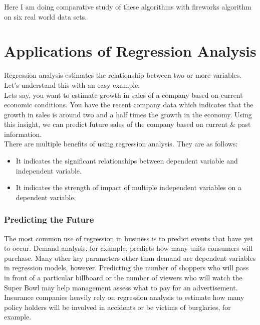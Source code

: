 \documentclass[11pt, a4paper]{report}
\begin{document}
Here I am doing comparative study of these algorithms with fireworks algorithm on six real world data sets.
\section{Applications of Regression Analysis}

Regression analysis estimates the relationship between two or more variables. Let’s understand this with an easy example: \\

Let\textquotesingle s say, you want to estimate growth in sales of a company based on current economic conditions. You have the recent company data which indicates that the growth in sales is around two and a half times the growth in the economy. Using this insight, we can predict future sales of the company based on current \& past information. \\

There are multiple benefits of using regression analysis. They are as follows:

\begin{itemize}
	\item It indicates the significant relationships between dependent variable and independent variable.
	
	\item It indicates the strength of impact of multiple independent variables on a dependent variable.
\end{itemize}

\subsubsection{Predicting the Future}
The most common use of regression in business is to predict events that have yet to occur. Demand analysis, for example, predicts how many units consumers will purchase. Many other key parameters other than demand are dependent variables in regression models, however. Predicting the number of shoppers who will pass in front of a particular billboard or the number of viewers who will watch the Super Bowl may help management assess what to pay for an advertisement. Insurance companies heavily rely on regression analysis to estimate how many policy holders will be involved in accidents or be victims of burglaries, for example. \cite{desc:RegressionApplication}
\end{document}
